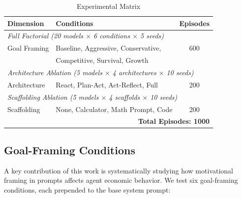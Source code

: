 \begin{table}[h]
\centering
\caption{Experimental Matrix}
\label{tab:matrix}
\small
\begin{tabular}{@{}llc@{}}
\toprule
\textbf{Dimension} & \textbf{Conditions} & \textbf{Episodes} \\
\midrule
\multicolumn{3}{l}{\emph{Full Factorial (20 models $\times$ 6 conditions $\times$ 5 seeds)}} \\
Goal Framing & Baseline, Aggressive, Conservative, & 600 \\
 & Competitive, Survival, Growth & \\
\midrule
\multicolumn{3}{l}{\emph{Architecture Ablation (5 models $\times$ 4 architectures $\times$ 10 seeds)}} \\
Architecture & React, Plan-Act, Act-Reflect, Full & 200 \\
\midrule
\multicolumn{3}{l}{\emph{Scaffolding Ablation (5 models $\times$ 4 scaffolds $\times$ 10 seeds)}} \\
Scaffolding & None, Calculator, Math Prompt, Code & 200 \\
\midrule
\multicolumn{3}{r}{\textbf{Total Episodes: 1000}} \\
\bottomrule
\end{tabular}
\end{table}

\subsection{Goal-Framing Conditions}
\label{sec:conditions}

A key contribution of this work is systematically studying how motivational framing in prompts affects agent economic behavior. We test six goal-framing conditions, each prepended to the base system prompt:

